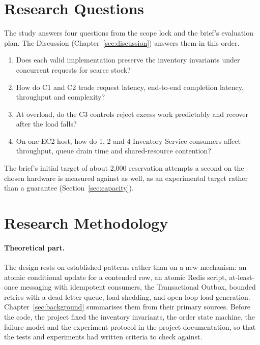 \documentclass[a4paper]{report}
\begin{document}
\section{Research Questions}
\label{sec:rq}

The study answers four questions from the scope lock and the brief's
evaluation plan. The Discussion (Chapter~\ref{sec:discussion}) answers them
in this order.
\begin{enumerate}[leftmargin=3em]
  \item[\textbf{RQ1}] Does each valid implementation preserve the inventory
    invariants under concurrent requests for scarce stock?
  \item[\textbf{RQ2}] How do C1 and C2 trade request latency, end-to-end
    completion latency, throughput and complexity?
  \item[\textbf{RQ3}] At overload, do the C3 controls reject excess work
    predictably and recover after the load falls?
  \item[\textbf{RQ4}] On one EC2 host, how do 1, 2 and 4 Inventory Service
    consumers affect throughput, queue drain time and shared-resource
    contention?
\end{enumerate}
The brief's initial target of about 2,000 reservation attempts a second on the
chosen hardware is measured against as well, as an experimental target rather
than a guarantee (Section~\ref{sec:capacity}).

\section{Research Methodology}

\paragraph{Theoretical part.} The design rests on established patterns rather
than on a new mechanism: an atomic conditional update for a contended row, an
atomic Redis script, at-least-once messaging with idempotent consumers, the
Transactional Outbox, bounded retries with a dead-letter queue, load shedding,
and open-loop load generation. Chapter~\ref{sec:background} summarises them from
their primary sources. Before the code, the project fixed the inventory
invariants, the order state machine, the failure model and the experiment
protocol in the project documentation, so that the tests and experiments
had written criteria to check against.
\end{document}

